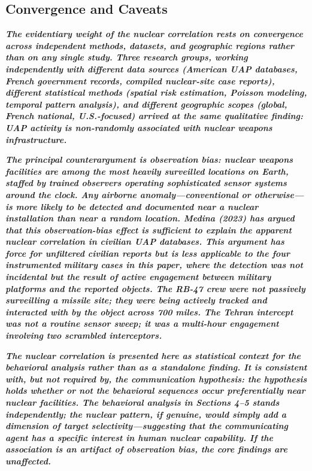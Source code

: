\documentclass[11pt,letterpaper]{article}
\begin{document}
\subsection{Convergence and Caveats}

\textbf{\textit{The evidentiary weight of the nuclear correlation rests on convergence across independent methods, datasets, and geographic regions rather than on any single study. Three research groups, working independently with different data sources (American UAP databases, French government records, compiled nuclear-site case reports), different statistical methods (spatial risk estimation, Poisson modeling, temporal pattern analysis), and different geographic scopes (global, French national, U.S.-focused) arrived at the same qualitative finding: UAP activity is non-randomly associated with nuclear weapons infrastructure.}}


\textbf{\textit{The principal counterargument is observation bias: nuclear weapons facilities are among the most heavily surveilled locations on Earth, staffed by trained observers operating sophisticated sensor systems around the clock. Any airborne anomaly---conventional or otherwise---is more likely to be detected and documented near a nuclear installation than near a random location. Medina (2023) has argued that this observation-bias effect is sufficient to explain the apparent nuclear correlation in civilian UAP databases. This argument has force for unfiltered civilian reports but is less applicable to the four instrumented military cases in this paper, where the detection was not incidental but the result of active engagement between military platforms and the reported objects. The RB-47 crew were not passively surveilling a missile site; they were being actively tracked and interacted with by the object across 700 miles. The Tehran intercept was not a routine sensor sweep; it was a multi-hour engagement involving two scrambled interceptors.}}


\textbf{\textit{The nuclear correlation is presented here as statistical context for the behavioral analysis rather than as a standalone finding. It is consistent with, but not required by, the communication hypothesis: the hypothesis holds whether or not the behavioral sequences occur preferentially near nuclear facilities. The behavioral analysis in Sections 4--5 stands independently; the nuclear pattern, if genuine, would simply add a dimension of target selectivity---suggesting that the communicating agent has a specific interest in human nuclear capability. If the association is an artifact of observation bias, the core findings are unaffected.}}
\end{document}
